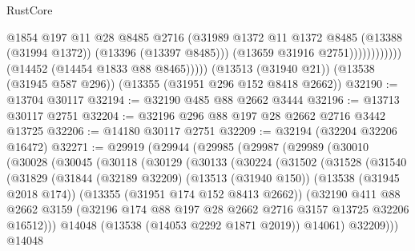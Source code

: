 \begin{lexlean}{RustCore}
\begin{coremodule}
                                @1854
                                @197
                                @11
                                @28
                                @8485
                                @2716
                                (@31989
                                  @1372
                                  @11
                                  @1372
                                  @8485
                                  (@13388 (@31994 @1372))
                                  (@13396 (@13397 @8485)))
                                (@13659 @31916 @2751))))))))))))
          (@14452 (@14454 @1833 @88 @8465)))))
    (@13513 (@31940 @21))
    (@13538 (@31945 @587 @296))
    (@13355 (@31951 @296 @152 @8418 @2662))
@32190 := @13704 @30117
@32194 := @32190 @485 @88 @2662 @3444
@32196 := @13713 @30117 @2751
@32204 := @32196 @296 @88 @197 @28 @2662 @2716 @3442 @13725
@32206 := @14180 @30117 @2751
@32209 := @32194 (@32204 @32206 @16472)
@32271 := @29919
    (@29944
      (@29985
        (@29987
          (@29989
            (@30010
              (@30028
                (@30045
                  (@30118
                    (@30129
                      (@30133
                        (@30224
                          (@31502
                            (@31528
                              (@31540
                                (@31829
                                  (@31844
                                    (@32189 @32209)
                                    (@13513 (@31940 @150))
                                    (@13538 (@31945 @2018 @174))
                                    (@13355 (@31951 @174 @152 @8413 @2662))
                                    (@32190
                                      @411
                                      @88
                                      @2662
                                      @3159
                                      (@32196
                                        @174
                                        @88
                                        @197
                                        @28
                                        @2662
                                        @2716
                                        @3157
                                        @13725
                                        @32206
                                        @16512)))
                                  @14048
                                  (@13538 (@14053 @2292 @1871 @2019))
                                  @14061)
                                @32209)))
                          @14048

\end{coremodule}
\end{lexlean}

